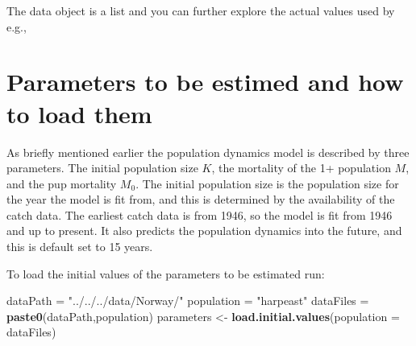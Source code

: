 \documentclass[
]{article}
\newenvironment{Shaded}{\begin{snugshade}}{\end{snugshade}}
\newcommand{\CommentTok}[1]{\textcolor[rgb]{0.56,0.35,0.01}{\textit{#1}}}
\newcommand{\DataTypeTok}[1]{\textcolor[rgb]{0.13,0.29,0.53}{#1}}
\newcommand{\KeywordTok}[1]{\textcolor[rgb]{0.13,0.29,0.53}{\textbf{#1}}}
\newcommand{\NormalTok}[1]{#1}
\newcommand{\OperatorTok}[1]{\textcolor[rgb]{0.81,0.36,0.00}{\textbf{#1}}}
\newcommand{\StringTok}[1]{\textcolor[rgb]{0.31,0.60,0.02}{#1}}
\begin{document}
The data object is a list and you can further explore the actual values
used by e.g.,

\begin{Shaded}
\end{Shaded}

\hypertarget{parameters-to-be-estimed-and-how-to-load-them}{%
\section{Parameters to be estimed and how to load
them}\label{parameters-to-be-estimed-and-how-to-load-them}}

As briefly mentioned earlier the population dynamics model is described
by three parameters. The initial population size \(K\), the mortality of
the 1+ population \(M\), and the pup mortality \(M_0\). The initial
population size is the population size for the year the model is fit
from, and this is determined by the availability of the catch data. The
earliest catch data is from 1946, so the model is fit from 1946 and up
to present. It also predicts the population dynamics into the future,
and this is default set to 15 years.

To load the initial values of the parameters to be estimated run:

\begin{Shaded}
\begin{Highlighting}[]
\NormalTok{dataPath =}\StringTok{ "../../../data/Norway/"}
\NormalTok{population =}\StringTok{ "harpeast"}
\NormalTok{dataFiles =}\StringTok{ }\KeywordTok{paste0}\NormalTok{(dataPath,population)}
\NormalTok{parameters <-}\StringTok{ }\KeywordTok{load.initial.values}\NormalTok{(}\DataTypeTok{population =}\NormalTok{ dataFiles)}
\end{Highlighting}
\end{Shaded}
\end{document}
